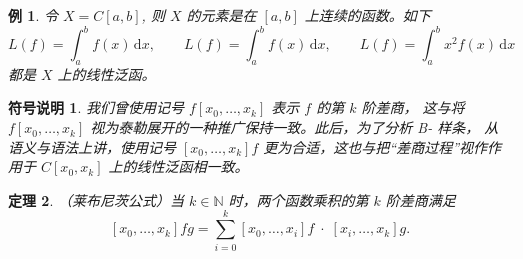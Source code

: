 \documentclass[a4paper]{ctexart}
\newtheorem{theorem}{定理}
\newtheorem{notation}{符号说明}
\newtheorem{example}[theorem]{例}
\numberwithin{theorem}{section}
\numberwithin{equation}{section}
\numberwithin{figure}{section}
\numberwithin{remark}{section}
\begin{document}
\begin{example}
    \label{ex::linear_functionals_on_Cab}
令 $X=C[a,b]$, 则 $X$ 的元素是在 $[a,b]$ 上连续的函数。如下
\begin{equation*}
\label{eq::functionals_examples}
L(f)=\int_{a}^{b} f(x)\,\mathrm{d}x,\qquad
L(f)=\int_{a}^{b} f(x)\,\mathrm{d}x,\qquad
L(f)=\int_{a}^{b} x^{2} f(x)\,\mathrm{d}x
\end{equation*}
都是 $X$ 上的线性泛函。
\end{example}

\begin{notation}
    \label{not::divided_diff_as_functional}
我们曾使用记号 $f[x_0,\ldots,x_k]$ 表示 $f$ 的第 $k$ 阶差商，
这与将 $f[x_0,\ldots,x_k]$ 视为泰勒展开的一种推广保持一致。此后，为了分析 B- 样条，
从语义与语法上讲，使用记号 $[x_0,\ldots,x_k]f$ 更为合适，这也与把“差商过程”视作作用于 $C[x_0,x_k]$ 上的线性泛函相一致。
\end{notation}

\begin{theorem}
    \label{thm::leibniz_divided_difference}
（莱布尼茨公式）当 $k\in\mathbb{N}$ 时，两个函数乘积的第 $k$ 阶差商满足
\begin{equation}
\label{eq::leibniz_divdiff}
[x_0,\ldots,x_k]fg=\sum_{i=0}^{k}[x_0,\ldots,x_i]f\;\cdot\;[x_i,\ldots,x_k]g.
\end{equation}
\end{theorem}
\end{document}
